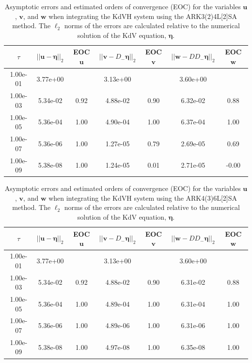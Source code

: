 \documentclass{article}
\newcommand{\ukdv}{\eta}
\begin{document}
\begin{table}[htbp]
\centering
\caption{Asymptotic errors and estimated orders of convergence (EOC) for the variables $\pmb{u}$, $\pmb{v}$, and $\pmb{w}$ when integrating
the KdVH system using the ARK3(2)4L[2]SA method. The $\ell_2$ norms of the errors are calculated relative to the
numerical solution of the KdV equation, $\pmb{\ukdv}$.}
\label{Table:ARK3(2)4L[2]SA_errors_num}
\begin{tabular}{ccccccc}
  \hline
  \hline
  \multicolumn{1}{c}{$\tau$} &
  \multicolumn{1}{c}{$||\pmb{u}-\pmb{\ukdv}||_2$} &
  \multicolumn{1}{c}{EOC $\pmb{u}$} &
  \multicolumn{1}{c}{$||\pmb{v}-D_- \pmb{\ukdv}||_2$} &
  \multicolumn{1}{c}{EOC $\pmb{v}$} &
  \multicolumn{1}{c}{$||\pmb{w}-D D_- \pmb{\ukdv}||_2$} &
  \multicolumn{1}{c}{EOC $\pmb{w}$} \\\hline
  1.00e-01 & 3.77e+00 &  & 3.13e+00 &  & 3.60e+00 &  \\
  1.00e-03 & 5.34e-02 & 0.92 & 4.88e-02 & 0.90 & 6.32e-02 & 0.88 \\
  1.00e-05 & 5.36e-04 & 1.00 & 4.90e-04 & 1.00 & 6.37e-04 & 1.00 \\
  1.00e-07 & 5.36e-06 & 1.00 & 1.27e-05 & 0.79 & 2.69e-05 & 0.69 \\
  1.00e-09 & 5.38e-08 & 1.00 & 1.24e-05 & 0.01 & 2.71e-05 & -0.00 \\
\end{tabular}
\end{table}


\begin{table}[htbp]
\centering
\caption{Asymptotic errors and estimated orders of convergence (EOC) for the variables $\pmb{u}$, $\pmb{v}$, and $\pmb{w}$ when integrating
the KdVH system using the ARK4(3)6L[2]SA method. The $\ell_2$ norms of the errors are calculated relative to the
numerical solution of the KdV equation, $\pmb{\ukdv}$.}
\label{Table:ARK4(3)6L[2]SA_errors_num}
\begin{tabular}{ccccccc}
  \hline
  \hline
  \multicolumn{1}{c}{$\tau$} &
  \multicolumn{1}{c}{$||\pmb{u}-\pmb{\ukdv}||_2$} &
  \multicolumn{1}{c}{EOC $\pmb{u}$} &
  \multicolumn{1}{c}{$||\pmb{v}-D_- \pmb{\ukdv}||_2$} &
  \multicolumn{1}{c}{EOC $\pmb{v}$} &
  \multicolumn{1}{c}{$||\pmb{w}-D D_- \pmb{\ukdv}||_2$} &
  \multicolumn{1}{c}{EOC $\pmb{w}$} \\\hline
  1.00e-01 & 3.77e+00 &  & 3.13e+00 &  & 3.60e+00 &  \\
  1.00e-03 & 5.34e-02 & 0.92 & 4.88e-02 & 0.90 & 6.31e-02 & 0.88 \\
  1.00e-05 & 5.36e-04 & 1.00 & 4.89e-04 & 1.00 & 6.31e-04 & 1.00 \\
  1.00e-07 & 5.36e-06 & 1.00 & 4.89e-06 & 1.00 & 6.31e-06 & 1.00 \\
  1.00e-09 & 5.38e-08 & 1.00 & 4.97e-08 & 1.00 & 6.35e-08 & 1.00 \\
\end{tabular}
\end{table}
\end{document}
